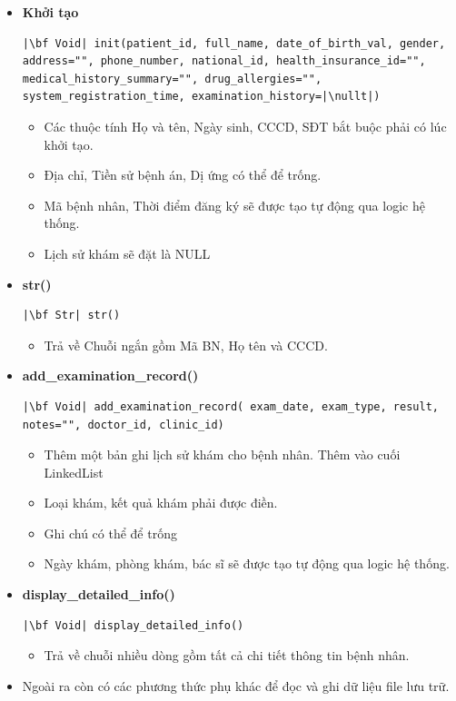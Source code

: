 \begin{itemize}
    \item \textbf{Khởi tạo}
\begin{verbatim}
|\bf Void| init(patient_id, full_name, date_of_birth_val, gender, address="", phone_number, national_id, health_insurance_id="", medical_history_summary="", drug_allergies="", system_registration_time, examination_history=|\nullt|)
\end{verbatim}
    \begin{itemize}
    \item Các thuộc tính Họ và tên, Ngày sinh, CCCD, SĐT bắt buộc phải có lúc khởi tạo.
    \item Địa chỉ, Tiền sử bệnh án, Dị ứng có thể để trống.
    \item Mã bệnh nhân, Thời điểm đăng ký sẽ được tạo tự động qua logic hệ thống.
    \item Lịch sử khám sẽ đặt là NULL
    \end{itemize}
    \item \textbf{str()}
\begin{verbatim}
|\bf Str| str()
\end{verbatim}
\begin{itemize}
    \item Trả về Chuỗi ngắn gồm Mã BN, Họ tên và CCCD.
\end{itemize}
    \item \textbf{add\_examination\_record()}
\begin{verbatim}
|\bf Void| add_examination_record( exam_date, exam_type, result, notes="", doctor_id, clinic_id)
\end{verbatim}
\begin{itemize}
    \item Thêm một bản ghi lịch sử khám cho bệnh nhân. Thêm vào cuối LinkedList
    \item Loại khám, kết quả khám phải được điền.
    \item Ghi chú có thể để trống
    \item Ngày khám, phòng khám, bác sĩ sẽ được tạo tự động qua logic hệ thống.
\end{itemize}
    \item \textbf{display\_detailed\_info()}
\begin{verbatim}
|\bf Void| display_detailed_info()
\end{verbatim}
\begin{itemize}
    \item Trả về chuỗi nhiều dòng gồm tất cả chi tiết thông tin bệnh nhân.
\end{itemize}
\item Ngoài ra còn có các phương thức phụ khác để đọc và ghi dữ liệu file lưu trữ.
\end{itemize}


